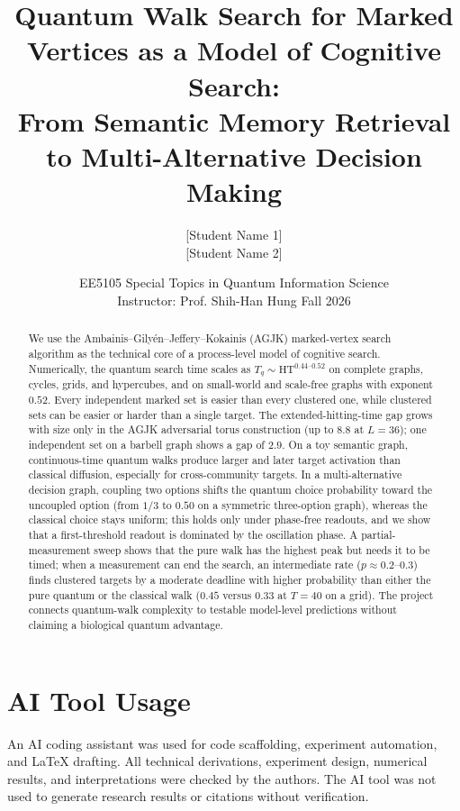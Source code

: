 \documentclass[11pt]{article}
\title{Quantum Walk Search for Marked Vertices as a Model of Cognitive Search:\\[0.3em]
\large From Semantic Memory Retrieval to Multi-Alternative Decision Making}
\author{[Student Name 1] \quad [Student ID 1]\\[0.2em]
[Student Name 2] \quad [Student ID 2]}
\date{EE5105 Special Topics in Quantum Information Science\\
Instructor: Prof. Shih-Han Hung \quad Fall 2026}
\newcommand{\HT}{\mathrm{HT}}
\theoremstyle{plain}
\theoremstyle{definition}
\begin{document}
\maketitle

\begin{abstract}
We use the Ambainis--Gily\'en--Jeffery--Kokainis (AGJK) marked-vertex search
algorithm as the technical core of a process-level model of cognitive search.
Numerically, the quantum search time scales as $T_q\sim \HT^{0.44\text{--}0.52}$
on complete graphs, cycles, grids, and hypercubes, and on small-world and
scale-free graphs with exponent $0.52$. Every independent marked set is easier
than every clustered one, while clustered sets can be easier or harder than a
single target. The extended-hitting-time gap grows with size only in the AGJK
adversarial torus construction (up to $8.8$ at $L=36$); one independent set on a
barbell graph shows a gap of $2.9$. On
a toy semantic graph, continuous-time quantum walks produce larger and later
target activation than classical diffusion, especially for cross-community
targets. In a multi-alternative decision graph, coupling two options shifts the
quantum choice probability toward the uncoupled option (from $1/3$ to $0.50$
on a symmetric three-option graph), whereas the classical choice stays
uniform; this holds only
under phase-free readouts, and we show that a first-threshold readout is
dominated by the oscillation phase. A partial-
measurement sweep shows that the pure walk has the highest peak but needs it
to be timed; when a measurement can end the search, an intermediate rate
($p\approx0.2$--$0.3$) finds clustered targets by a moderate deadline with
higher probability than either the pure quantum or the classical walk
($0.45$ versus $0.33$ at $T=40$ on a grid).
The project connects quantum-walk complexity to testable model-level predictions
without claiming a biological quantum advantage.
\end{abstract}










\section*{AI Tool Usage}
An AI coding assistant was used for code scaffolding, experiment automation,
and LaTeX drafting. All technical derivations, experiment design, numerical
results, and interpretations were checked by the authors. The AI tool was not
used to generate research results or citations without verification.

\appendix




\end{document}
